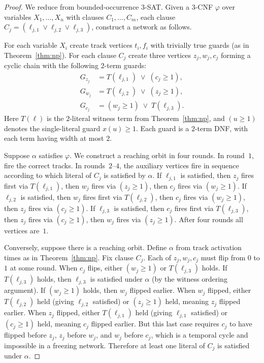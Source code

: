 \documentclass[final,3p,times]{elsarticle}
\theoremstyle{definition}
\theoremstyle{remark}
\begin{document}
\begin{proof}
We reduce from bounded-occurrence $3$-SAT.
Given a $3$-CNF $\varphi$ over variables $X_1,\dots,X_n$ with clauses $C_1,\dots,C_m$, each clause $C_j=(\ell_{j,1}\vee\ell_{j,2}\vee\ell_{j,3})$, construct a network as follows.

For each variable $X_i$ create track vertices $t_i,f_i$ with trivially true guards (as in Theorem~\ref{thm:np}).
For each clause $C_j$ create three vertices $z_j,w_j,c_j$ forming a cyclic chain with the following $2$-term guards:
\begin{align*}
G_{z_j}&=T(\ell_{j,1})\;\vee\;(c_j{\ge}1),\\
G_{w_j}&=T(\ell_{j,2})\;\vee\;(z_j{\ge}1),\\
G_{c_j}&=(w_j{\ge}1)\;\vee\;T(\ell_{j,3}).
\end{align*}
Here $T(\ell)$ is the $2$-literal witness term from Theorem~\ref{thm:np}, and $(u{\ge}1)$ denotes the single-literal guard $x(u)\ge 1$.
Each guard is a $2$-term DNF, with each term having width at most $2$.

Suppose $\alpha$ satisfies $\varphi$.
We construct a reaching orbit in four rounds.
In round~$1$, fire the correct tracks.
In rounds~$2$--$4$, the auxiliary vertices fire in sequence according to which literal of $C_j$ is satisfied by $\alpha$.
If $\ell_{j,1}$ is satisfied, then $z_j$ fires first via $T(\ell_{j,1})$, then $w_j$ fires via $(z_j{\ge}1)$, then $c_j$ fires via $(w_j{\ge}1)$.
If $\ell_{j,2}$ is satisfied, then $w_j$ fires first via $T(\ell_{j,2})$, then $c_j$ fires via $(w_j{\ge}1)$, then $z_j$ fires via $(c_j{\ge}1)$.
If $\ell_{j,3}$ is satisfied, then $c_j$ fires first via $T(\ell_{j,3})$, then $z_j$ fires via $(c_j{\ge}1)$, then $w_j$ fires via $(z_j{\ge}1)$.
After four rounds all vertices are~$1$.

Conversely, suppose there is a reaching orbit.
Define $\alpha$ from track activation times as in Theorem~\ref{thm:np}.
Fix clause $C_j$.
Each of $z_j,w_j,c_j$ must flip from $0$ to $1$ at some round.
When $c_j$ flips, either $(w_j{\ge}1)$ or $T(\ell_{j,3})$ holds.
If $T(\ell_{j,3})$ holds, then $\ell_{j,3}$ is satisfied under $\alpha$ (by the witness ordering argument).
If $(w_j{\ge}1)$ holds, then $w_j$ flipped earlier.
When $w_j$ flipped, either $T(\ell_{j,2})$ held (giving $\ell_{j,2}$ satisfied) or $(z_j{\ge}1)$ held, meaning $z_j$ flipped earlier.
When $z_j$ flipped, either $T(\ell_{j,1})$ held (giving $\ell_{j,1}$ satisfied) or $(c_j{\ge}1)$ held, meaning $c_j$ flipped earlier.
But this last case requires $c_j$ to have flipped before $z_j$, $z_j$ before $w_j$, and $w_j$ before $c_j$, which is a temporal cycle and impossible in a freezing network.
Therefore at least one literal of $C_j$ is satisfied under $\alpha$.
\end{proof}
\end{document}
